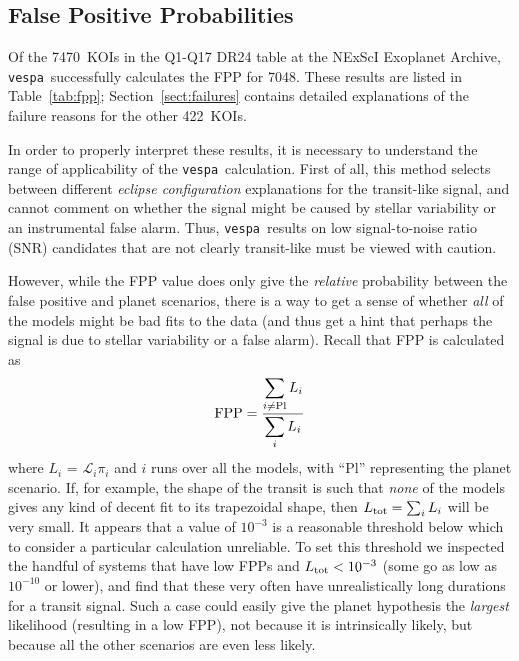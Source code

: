 \documentclass{emulateapj}
\newcommand{\Tab}[1]{Table~\ref{tab:#1}}
\newcommand{\tab}[1]{\Tab{#1}}
\newcommand{\eqlabel}[1]{\label{eq:#1}}
\newcommand{\sectionname}{Section}
\newcommand{\Sect}[1]{\sectionname~\ref{sect:#1}}
\newcommand{\sect}[1]{\Sect{#1}}
\newcommand{\sectlabel}[1]{\label{sect:#1}}
\newcommand{\ntotal}{7470}
\newcommand{\nfail}{422}
\newcommand{\ncalc}{7048}
\newcommand{\vespa}{\texttt{vespa}}
\begin{document}

\subsection{False Positive Probabilities}
\sectlabel{results:fpp}

Of the \ntotal\ KOIs in the Q1-Q17 DR24 table at the NExScI Exoplanet
Archive, \vespa\ successfully calculates the FPP for \ncalc.  These
results are listed in \tab{fpp};  \sect{failures} contains detailed
explanations of the failure reasons for the other \nfail\ KOIs.

In order to properly interpret these results, it is necessary to
understand the range of applicability of the \vespa\ calculation.
First of all, this method selects between different \emph{eclipse
  configuration} explanations for the transit-like signal, and cannot
comment on whether the signal might be caused by stellar variability
or an instrumental false alarm.  Thus, \vespa\ results on low
signal-to-noise ratio (SNR) candidates that are not clearly
transit-like must be viewed with caution.  

However, while the FPP value does only give the \emph{relative}
probability between the false positive and planet scenarios, there is
a way to get a sense of whether \emph{all} of the models might be bad
fits to the data (and thus get a hint that perhaps the signal is due
to stellar variability or a false alarm).  Recall that FPP is
calculated as
\begin{equation}
\eqlabel{fpp}
{\rm FPP} = \frac{\displaystyle\sum_{i \neq {\rm Pl}}
  L_i}{\displaystyle \sum_i L_i}
\end{equation}
where $L_i$ = $\mathcal L_i \pi_i$ and $i$ runs over all the models,
with ``Pl'' representing the planet scenario.  If, for example, the
shape of the transit is such that \emph{none} of the models gives any
kind of decent fit to its trapezoidal shape, then $L_{\rm tot} =
\sum_i L_i$ will be very small.  It appears that a value of $10^{-3}$
is a reasonable threshold below which to consider a particular
calculation unreliable.  To set this threshold we inspected the
handful of systems that have low FPPs and $L_{\rm tot} < 10^{-3}$
(some go as low as $10^{-10}$ or lower), and find that these very
often have unrealistically long durations for a transit signal.  Such
a case could easily give the planet hypothesis the \emph{largest}
likelihood (resulting in a low FPP), not because it is intrinsically
likely, but because all the other scenarios are even less likely.
\end{document}
